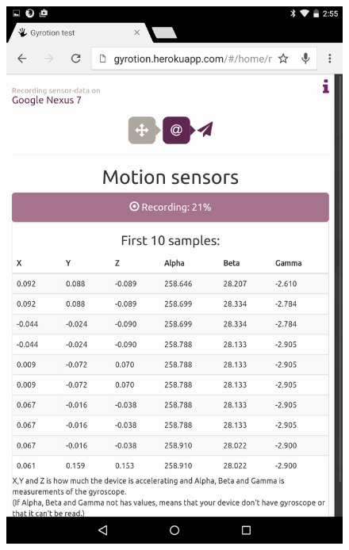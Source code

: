 \begin{figure}[!htb]
  \hspace{-2cm}
  \centering
  \begin{minipage}[c]{.23\textwidth}
    \centering
    \includegraphics[scale=0.1]{img/Nexus-rec}
  \end{minipage}
  \hspace{2cm}
  \begin{minipage}[c]{.23\textwidth}
    \centering

\end{minipage}
\end{figure}
